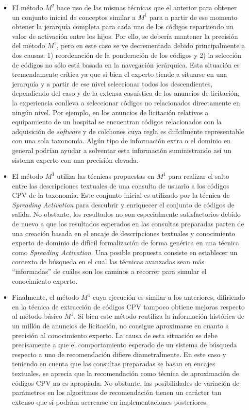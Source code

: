 \begin{itemize}
\item El método $M^2$ hace uso de las mismas técnicas que el anterior para obtener un conjunto inicial de conceptos 
similar a $M^1$ para a partir de ese momento obtener la jerarquía completa para cada uno de los códigos repartiendo 
un valor de activación entre los hijos. Por ello, se debería mantener la precisión del método $M^1$, pero en este caso 
se ve decrementada debido principalmente a dos causas: 1) reordenación de la ponderación de los códigos y 2) la selección 
de códigos no sólo está basada en la navegación jerárquica. Esta situación es tremendamente crítica ya que si bien el experto 
tiende a situarse en una jerarquía y a partir de ese nivel seleccionar todos los descendientes, dependiendo del caso y de la 
extensa casuística de los anuncios de licitación, la experiencia conlleva a seleccionar códigos no relacionados directamente 
en ningún nivel. Por ejemplo, en los anuncios de licitación relativos a equipamiento de un hospital se encuentran códigos 
relacionados con la adquisición de \textit{software} y de colchones cuya regla es difícilmente representable con 
una sola taxonomía. Algún tipo de información extra o el dominio en general podrían ayudar a solventar esta información suministrando
así un sistema experto con una precisión elevada.

\item El método $M^3$ utiliza las técnicas propuestas en $M^1$ para realizar el salto entre las descripciones textuales 
de una consulta de usuario a los códigos CPV de la taxonomía. Este conjunto inicial es utilizado por la técnica de \textit{Spreading 
Activation} para descubrir y enriquecer el conjunto de códigos de salida. No obstante, los resultados no son especialmente satisfactorios 
debido de nuevo a que los resultados esperados en las consultas preparadas parten de una creación basada en el encaje de descripciones 
textuales y conocimiento experto de dominio de difícil formalización de forma genérica en una técnica como \textit{Spreading Activation}. Una 
posible propuesta consiste en establecer un contexto de búsqueda en el cual las técnicas avanzadas sean más ``informadas'' de cuáles 
son los caminos a recorrer para simular el conocimiento experto.

\item Finalmente, el método $M^4$ cuya ejecución es similar a los anteriores, difiriendo en la técnica de extracción 
de códigos CPV tampoco obtiene mejoras respecto al método básico $M^1$. Si bien este método reutiliza la información histórica 
de un millón de anuncios de licitación, no consigue aproximarse en cuanto a precisión al conocimiento experto. La causa de esta 
situación se debe precisamente a que el comportamiento esperado de un sistema de búsqueda respecto a uno de recomendación 
difiere diametralmente. En este caso y teniendo en cuenta que las consultas preparadas se basan en encajes textuales, 
se aprecia que la recomendación como técnica de aproximación de códigos CPV no es apropiada. No obstante, las posibilidades 
de variación de parámetros en los algoritmos de recomendación tienen un carácter tan extenso que sí podrían acercarse 
en implementaciones posteriores.


\end{itemize}
